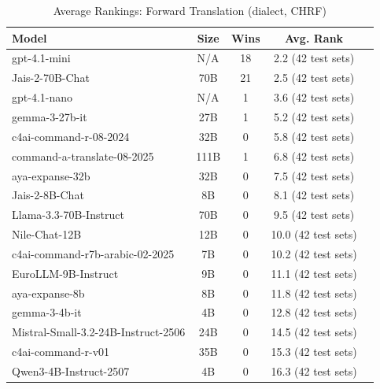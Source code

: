 \begin{table}[htbp]
\centering
\caption{Average Rankings: Forward Translation (dialect, CHRF)}
\label{tab:avg_rankings_chrf_dialect}
\begin{tabular}{l@{\hspace{3pt}}c@{\hspace{3pt}}c@{\hspace{3pt}}c@{\hspace{3pt}}c}
\toprule
Model & Size & Wins & Avg. Rank \\
\midrule
gpt-4.1-mini & N/A & 18 & 2.2 (42 test sets) \\
Jais-2-70B-Chat & 70B & 21 & 2.5 (42 test sets) \\
gpt-4.1-nano & N/A & 1 & 3.6 (42 test sets) \\
gemma-3-27b-it & 27B & 1 & 5.2 (42 test sets) \\
c4ai-command-r-08-2024 & 32B & 0 & 5.8 (42 test sets) \\
command-a-translate-08-2025 & 111B & 1 & 6.8 (42 test sets) \\
aya-expanse-32b & 32B & 0 & 7.5 (42 test sets) \\
Jais-2-8B-Chat & 8B & 0 & 8.1 (42 test sets) \\
Llama-3.3-70B-Instruct & 70B & 0 & 9.5 (42 test sets) \\
Nile-Chat-12B & 12B & 0 & 10.0 (42 test sets) \\
c4ai-command-r7b-arabic-02-2025 & 7B & 0 & 10.2 (42 test sets) \\
EuroLLM-9B-Instruct & 9B & 0 & 11.1 (42 test sets) \\
aya-expanse-8b & 8B & 0 & 11.8 (42 test sets) \\
gemma-3-4b-it & 4B & 0 & 12.8 (42 test sets) \\
Mistral-Small-3.2-24B-Instruct-2506 & 24B & 0 & 14.5 (42 test sets) \\
c4ai-command-r-v01 & 35B & 0 & 15.3 (42 test sets) \\
Qwen3-4B-Instruct-2507 & 4B & 0 & 16.3 (42 test sets) \\
\bottomrule
\end{tabular}
\end{table}